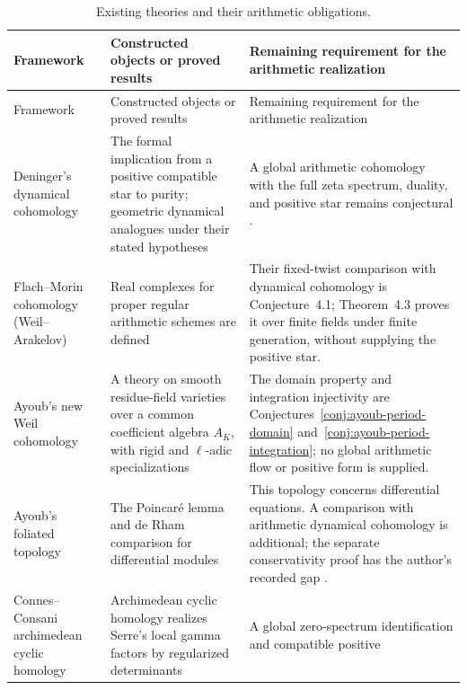 \documentclass[11pt]{amsart}
\theoremstyle{plain}
\theoremstyle{definition}
\theoremstyle{remark}
\numberwithin{equation}{section}
\begin{document}
{\small
\setlength{\tabcolsep}{4pt}
\begin{longtable}{@{}>{\raggedright\arraybackslash}p{}
  >{\raggedright\arraybackslash}p{}
  >{\raggedright\arraybackslash}p{}@{}}
\caption{Existing theories and their arithmetic obligations.}
\label{tab:theory-status}\\
\toprule
Framework & Constructed objects or proved results &
Remaining requirement for the arithmetic realization\\
\midrule
\endfirsthead
\toprule
Framework & Constructed objects or proved results &
Remaining requirement for the arithmetic realization\\
\midrule
\endhead
Deninger's dynamical cohomology &
The formal implication from a positive compatible star to purity;
geometric dynamical analogues under their stated hypotheses
\cite[pp.~4--5]{Deninger2010HilbertPolya} &
A global arithmetic cohomology with the full zeta spectrum,
duality, and positive star remains conjectural
\cite[Conj.~2.3]{FlachMorin2020DeningerWeilArakelov}.\\
Flach--Morin cohomology (Weil--Arakelov) &
Real complexes for proper regular arithmetic schemes are defined
\cite[\S3]{FlachMorin2020DeningerWeilArakelov} &
Their fixed-twist comparison with dynamical cohomology is
Conjecture~4.1; Theorem~4.3 proves it over finite fields under
finite generation, without supplying the positive star.\\
Ayoub's new Weil cohomology &
A theory on smooth residue-field varieties over a common
coefficient algebra $A_K$, with rigid and $\ell$-adic
specializations \cite[Thm.~1.5]{Ayoub2020NewWeil} &
The domain property and integration injectivity are
Conjectures~\ref{conj:ayoub-period-domain}
and~\ref{conj:ayoub-period-integration};
no global arithmetic flow or positive form is supplied.\\
Ayoub's foliated topology &
The Poincar\'e lemma and de Rham comparison for differential
modules \cite[Thm.~5.7.4, Cor.~5.7.7]{Ayoub2019FoliatedDGalois} &
This topology concerns differential equations. A comparison
with arithmetic dynamical cohomology is additional;
the separate conservativity proof has the author's recorded
gap \cite[\href{https://user.math.uzh.ch/ayoub/}
{conservativity manuscript notice}]{AyoubHomepage}.\\
Connes--Consani archimedean cyclic homology &
Archimedean cyclic homology realizes Serre's local gamma
factors by regularized determinants
\cite[Thm.~1.1]{ConnesConsani2014CyclicSerre} &
A global zero-spectrum identification and compatible positive

\end{longtable}}
\end{document}
